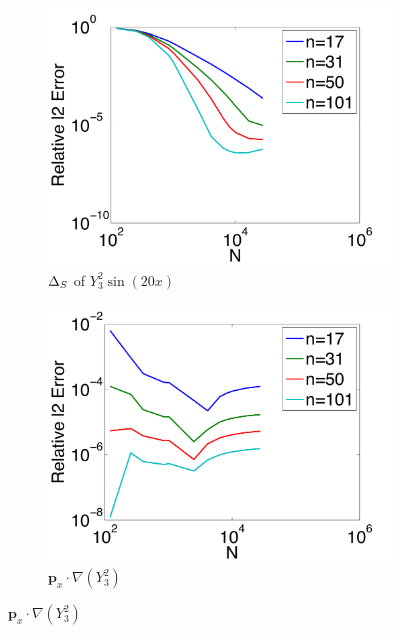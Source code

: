 \begin{figure}[htbp]
	\centering
	\begin{subfigure}[b]{0.425\textwidth}
	\includegraphics[width=1.0\textwidth]{../figures/appendices/direct_vs_indirect_weights/compare_weight_generation/lsfc_vs_px_grad_dot_px_grad/direct_rel_l2_error.pdf}
	\caption{$\LaplaceBeltrami$ of $Y_{3}^{2} \sin(20 x)$}
		\end{subfigure}
	\begin{subfigure}[b]{0.425\textwidth}
	\includegraphics[width=1.0\textwidth]{../figures/appendices/direct_vs_indirect_weights/compare_weight_generation/xsfc_vs_xsfc_alt_on_sph32/direct_rel_l2_error.pdf}
	\caption{$\mathbf{p}_{x} \cdot \nabla ( Y_{3}^{2})$ }
	\end{subfigure}

\end{figure}
